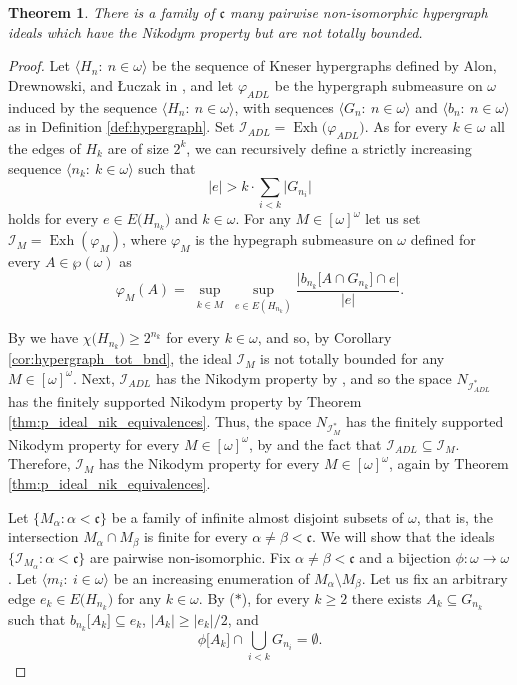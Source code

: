 \documentclass[a4paper,11pt,fleqn]{amsart}
\newtheorem{theorem}{Theorem}[section]
\theoremstyle{definition}
\theoremstyle{remark}
\numberwithin{equation}{section}
\newcommand{\frakc}{\mathfrak{c}}
\newcommand{\N}{\mathbb{N}}
\newcommand{\iI}{\mathcal{I}}
\DeclareMathOperator{\exh}{Exh}
\newcommand{\sub}{\subseteq}
\newcommand{\seqn}[1]{\big\langle#1\colon\ n\io\big\rangle}
\newcommand{\seqk}[1]{\big\langle#1\colon\ k\io\big\rangle}
\newcommand{\seqi}[1]{\big\langle#1\colon\ i\io\big\rangle}
\newcommand{\ctblsub}[1]{\left[#1\right]^\omega}
\newcommand{\io}{\in\omega}%
\newcommand{\wo}{{\wp(\omega)}}%
\newcommand{\cso}{\ctblsub{\omega}}%
\begin{document}
\begin{theorem}\label{thm:hypergraph_nikodym_not_tot_bnd}
There is a family of $\frakc$ many pairwise non-isomorphic  hypergraph ideals which have the Nikodym property but are not totally bounded.   
\end{theorem}
\begin{proof}
Let $\seqn{H_n}$ be the sequence of Kneser hypergraphs defined by Alon, Drewnowski, and \L uczak in \cite[Section 4]{ADL09}, and let $\varphi_{ADL}$ be the hypergraph submeasure on $\omega$ induced by the sequence $\seqn{H_n}$, with sequences $\seqn{G_n}$ and $\seqn{b_n}$ as in Definition \ref{def:hypergraph}.  Set $\iI_{ADL}=\exh\big(\varphi_{ADL}\big)$. As for every $k\io$ all the edges of $H_k$ are of size $2^k$, we can recursively define a strictly increasing sequence $\seqk{n_k}$ such that
\[\tag{$*$}
|e| > k\cdot\sum_{i<k}\big|G_{n_i}\big|
\]
holds for every $e\in E\big(H_{n_k}\big)$ and $k\io$. For any $M\in\cso$ let us set $\iI_M=\exh(\varphi_M)$, where $\varphi_M$ is the hypegraph submeasure on $\omega$ defined for every $A\in\wo$ as
\[\varphi_M(A)=\sup_{\substack{k\in M}}\sup_{e\in E(H_{n_k})}\frac{\Big|b_{n_k}\big[A\cap G_{n_k}\big]\cap e\Big|}{|e|}.\]
    
By \cite[Corollary 3.4]{ADL09} we have $\chi\big(H_{n_k}\big)\ge 2^{n_k}$ for every $k\io$, and so, by Corollary \ref{cor:hypergraph_tot_bnd}, the ideal $\iI_M$ is not totally bounded for any $M\in\cso$. Next, $\iI_{ADL}$ has the Nikodym property by \cite[Theorem 2.3]{ADL09}, and so the space $N_{\iI_{ADL}^*}$ has the finitely supported Nikodym property by Theorem \ref{thm:p_ideal_nik_equivalences}. Thus, the space $N_{\iI_{M}^*}$ has the finitely supported Nikodym property for every $M\in\cso$, by \cite[Proposition 5.2]{Zuc25} and the fact that $\iI_{ADL}\sub\iI_M$. Therefore, $\iI_{M}$ has the Nikodym property for every $M\in\cso$, again by Theorem \ref{thm:p_ideal_nik_equivalences}.

Let $\big\{M_\alpha\colon\alpha<\frakc\big\}$ be a family of infinite almost disjoint subsets of $\omega$, that is, the intersection $M_\alpha\cap M_\beta$ is finite for every $\alpha\neq\beta<\frakc$. We will show that the ideals $\big\{\iI_{M_\alpha}\colon\alpha<\frakc\big\}$ are pairwise non-isomorphic. Fix $\alpha\neq\beta<\frakc$ and a bijection $\phi\colon\omega\to\omega$. Let $\seqi{m_i}$ be an increasing enumeration of $M_\alpha\setminus M_\beta$. Let us fix an arbitrary edge $e_k\in E\big(H_{n_k}\big)$ for any $k\io$. By ($*$), for every $k\geq 2$ there exists $A_k\sub G_{n_k}$ such that $b_{n_k}\big[A_k\big]\sub e_k$, $\big|A_k\big|\geq\big|e_k\big|/2$, and 
\[\tag{$**$}\phi\big[A_k\big]\cap\bigcup_{i<k} G_{n_i} = \emptyset.\]


\end{proof}
\end{document}
